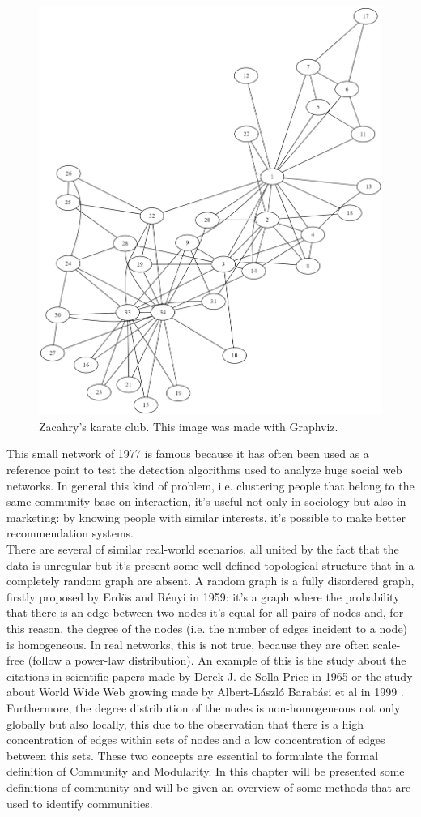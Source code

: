 \begin{figure}
	\centering
	\includegraphics[width=0.6\linewidth]{0-resources/karateclub}
	\caption{Zacahry's karate club. \cite{Zac77} This image was made with Graphviz.}
	\label{fig:karateclub}
\end{figure}
This small network of 1977 is famous because it has often been used as a reference point to test the detection algorithms used to analyze huge social web networks.
In general this kind of problem, i.e. clustering people that belong to the same community base on interaction, it's useful not only in sociology but also in marketing: by knowing people with similar interests, it's possible to make better recommendation systems.\\
There are several of similar real-world scenarios, all united by the fact that the data is unregular but it's present some well-defined topological structure that in a completely random graph are absent. A random graph is a fully disordered graph, firstly proposed by Erdös and Rényi \cite{random} in 1959: it's a graph where the probability that there is an edge between two nodes it's equal for all pairs of nodes and, for this reason, the degree of the nodes (i.e. the number of edges incident to a node) is homogeneous. In real networks, this is not true, because they are often scale-free (follow a power-law distribution). An example of this is the study about the citations in scientific papers made by Derek J. de Solla Price in 1965 \cite{dsp} or the study about World Wide Web growing made by Albert-László Barabási et al in 1999 \cite{Barab}.
Furthermore, the degree distribution of the nodes is non-homogeneous not only globally but also locally, this due to the observation that there is a high concentration of edges within sets of nodes and a low concentration of edges between this sets. These two concepts are essential to formulate the formal definition of Community and Modularity. In this chapter will be presented some definitions of community and will be given an overview of some methods that are used to identify communities.
